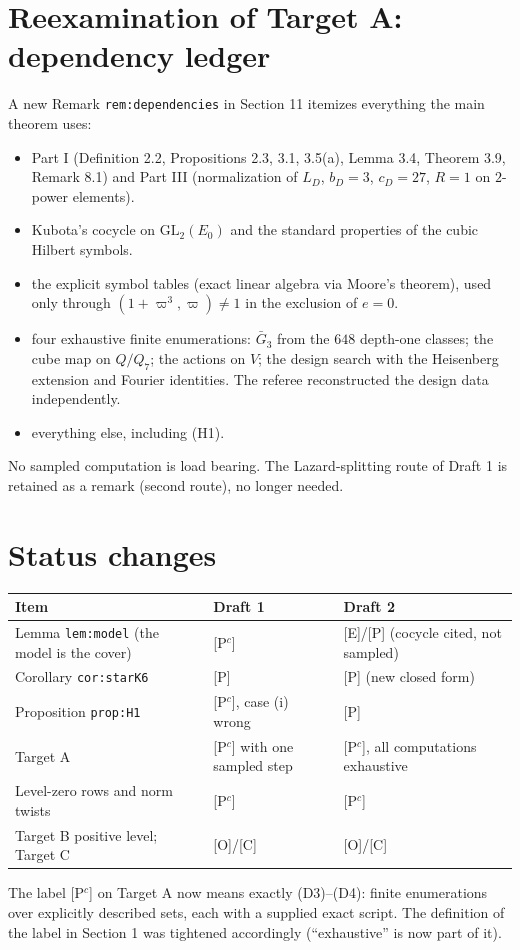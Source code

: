\documentclass[11pt]{article}
\begin{document}
\section*{Reexamination of Target A: dependency ledger}
A new Remark \texttt{rem:dependencies} in Section 11 itemizes everything
the main theorem uses:
\begin{itemize}[leftmargin=*]
\item[(D1)] [E] Part I (Definition 2.2, Propositions 2.3, 3.1, 3.5(a),
Lemma 3.4, Theorem 3.9, Remark 8.1) and Part III (normalization of
$L_D$, $b_D=3$, $c_D=27$, $R=1$ on $2$-power elements).
\item[(D2)] [E] Kubota's cocycle on $\mathrm{GL}_2(E_0)$ and the standard
properties of the cubic Hilbert symbols.
\item[(D3)] [P$^c$] the explicit symbol tables (exact linear algebra via
Moore's theorem), used only through $(1+\varpi^3,\varpi)\neq1$ in the
exclusion of $e=0$.
\item[(D4)] [P$^c$] four exhaustive finite enumerations: $\bar G_3$ from
the $648$ depth-one classes; the cube map on $Q/Q_7$; the actions on
$V$; the design search with the Heisenberg extension and Fourier
identities.  The referee reconstructed the design data independently.
\item[(D5)] [P] everything else, including (H1).
\end{itemize}
No sampled computation is load bearing.  The Lazard-splitting route of
Draft 1 is retained as a remark (second route), no longer needed.

\section*{Status changes}
\begin{center}
\begin{tabular}{lll}
\toprule
Item & Draft 1 & Draft 2\\
\midrule
Lemma \texttt{lem:model} (the model is the cover) & [P$^c$] & [E]/[P] (cocycle cited, not sampled)\\
Corollary \texttt{cor:starK6} & [P] & [P] (new closed form)\\
Proposition \texttt{prop:H1} & [P$^c$], case (i) wrong & [P]\\
Target A & [P$^c$] with one sampled step & [P$^c$], all computations exhaustive\\
Level-zero rows and norm twists & [P$^c$] & [P$^c$]\\
Target B positive level; Target C & [O]/[C] & [O]/[C]\\
\bottomrule
\end{tabular}
\end{center}
The label [P$^c$] on Target A now means exactly (D3)--(D4): finite
enumerations over explicitly described sets, each with a supplied exact
script.  The definition of the label in Section 1 was tightened
accordingly (``exhaustive'' is now part of it).
\end{document}
